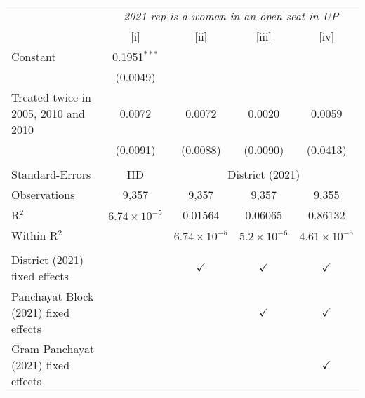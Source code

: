 
\begingroup
\centering
\begin{tabular}{lcccc}
   \toprule
    & \multicolumn{4}{c}{\textit{2021 rep is a woman in an open seat in UP}}\\
                                        & [i]                   & [ii]                  & [iii]                & [iv]\\  
   \midrule 
   Constant                             & 0.1951$^{***}$        &                       &                      &   \\   
                                        & (0.0049)              &                       &                      &   \\   
   Treated twice in 2005, 2010 and 2010 & 0.0072                & 0.0072                & 0.0020               & 0.0059\\   
                                        & (0.0091)              & (0.0088)              & (0.0090)             & (0.0413)\\   
    \\
   Standard-Errors & IID & \multicolumn{3}{c}{District (2021)} \\ 
   Observations                         & 9,357                 & 9,357                 & 9,357                & 9,355\\  
   R$^2$                                & $6.74\times 10^{-5}$  & 0.01564               & 0.06065              & 0.86132\\  
   Within R$^2$                         &                       & $6.74\times 10^{-5}$  & $5.2\times 10^{-6}$  & $4.61\times 10^{-5}$\\   
    \\
   District (2021) fixed effects        &                       & $\checkmark$          & $\checkmark$         & $\checkmark$\\   
   Panchayat Block (2021) fixed effects &                       &                       & $\checkmark$         & $\checkmark$\\   
   Gram Panchayat (2021) fixed effects  &                       &                       &                      & $\checkmark$\\   
   \bottomrule
\end{tabular}
\par\endgroup


